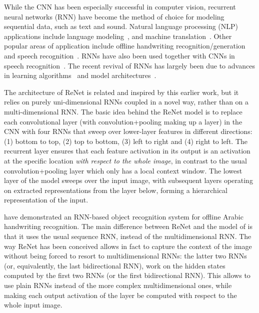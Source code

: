 While the CNN has been especially successful in computer vision, recurrent
neural networks (RNN) have become the method of choice for modeling sequential
data, such as text and sound. Natural language processing (NLP) applications
include language modeling~\citep[see, e.g.,][]{Mikolov-thesis-2012}, and
machine translation~\citep{Sutskever-et-al-NIPS2014,Cho2014,
bahdanau2014neural}. Other popular areas of application include offline
handwriting recognition/generation~\citep{Graves+Schmidhuber-2009,
Graves-et-al-NIPS2007,Graves-arxiv2013} and speech recognition~\citep{
Chorowski-et-al-arxiv2014,Graves+Jaitly-ICML2014}. RNNs have also been used
together with CNNs in speech recognition~\citep{sainath2015}. The recent
revival of RNNs has largely been due to advances in learning
algorithms~\citep{Pascanu+al-ICML2013-small,Martens+Sutskever-ICML2011} and
model architectures~\citep{Pascanu-et-al-ICLR2014,Hochreiter+Schmidhuber-1997,
Cho2014}.

The architecture of ReNet is related and inspired by this earlier work, but it
relies on purely uni-dimensional RNNs coupled in a novel way, rather than on a
multi-dimensional RNN. The basic idea behind the ReNet model is to replace each
convolutional layer (with convolution+pooling making up a layer) in the CNN
with four RNNs that sweep over lower-layer features in different directions:
(1) bottom to top, (2) top to bottom, (3) left to right and (4) right to left.
The recurrent layer ensures that each feature activation in its output is an
activation at the specific location \emph{with respect to the whole image}, in
contrast to the usual convolution+pooling layer which only has a local context
window. The lowest layer of the model sweeps over the input image, with
subsequent layers operating on extracted representations from the layer below,
forming a hierarchical representation of the input.

\citet{Graves+Schmidhuber-2009} have demonstrated an RNN-based object
recognition system for offline Arabic handwriting recognition. The main
difference between ReNet and the model of \citet{Graves+Schmidhuber-2009} is
that it uses the usual sequence RNN, instead of the multidimensional RNN. The
way ReNet has been conceived allows in fact to capture the context of the
image without being forced to resort to multidimensional RNNs: the latter two
RNNs (or, equivalently, the last bidirectional RNN), work on the hidden states
computed by the first two RNNs (or the first bidirectional RNN). This allows
to use plain RNNs instead of the more complex multidimensional ones, while
making each output activation of the layer be computed with respect to the
whole input image.

